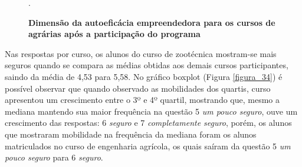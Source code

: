 \begin{figure}[H]
\center
\caption{\textbf{Dimensão da autoeficácia empreendedora para os cursos de agrárias após a participação do programa}}
\qquad
{}
.
\label{figura_29}
\end{figure}


Nas respostas por curso, os alunos do curso de zootécnica mostram-se mais seguros quando se compara as médias obtidas aos demais cursos participantes, saindo da média de 4,53 para 5,58. No gráfico boxplot (Figura \ref{figura_34}) é possível observar que quando observado as mobilidades dos quartis, curso apresentou um crescimento entre o 3º e 4º quartil, mostrando que, mesmo a mediana mantendo sua maior frequência na questão 5 \textit{um pouco seguro}, ouve um crescimento das respostas: 6 \textit{seguro} e 7 \textit{completamente seguro}, porém, os alunos que mostraram mobilidade na frequência da mediana foram os alunos matriculados no curso de engenharia agrícola, os quais saíram da questão 5 \textit{um pouco seguro} para 6 \textit{seguro}. 


